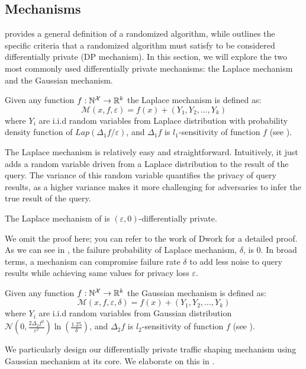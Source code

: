 \subsection{Mechanisms}\label{subsec:background-dp-mechanism}
 provides a general definition of a randomized algorithm, while  outlines the specific criteria that a randomized algorithm must satisfy to be considered differentially private (\ie DP mechanism).
In this section, we will explore the two most commonly used differentially private mechanisms: the Laplace mechanism and the Gaussian mechanism\cite{dwork2014algorithmic}.
\begin{definition}\label{def:laplace-mechanism}
  Given any function $f: \mathbb{N}^\mathcal{X} \rightarrow \mathbb{R}^k$ the Laplace mechanism is defined as:
  \begin{equation*}
    \mathcal{M}(x, f, \varepsilon) = f(x) + (Y_1, Y_2, \dots, Y_k)
  \end{equation*}
  where $Y_i$ are i.i.d random variables from Laplace distribution with probability density function of $Lap(\Delta_1 f/\varepsilon)$, and $\Delta_1 f$ is $l_1$-sensitivity of function $f$ (see ).
\end{definition}
The Laplace mechanism is relatively easy and straightforward. 
Intuitively, it just adds a random variable driven from a Laplace distribution to the result of the query.
The variance of this random variable quantifies the privacy of query results, as a higher variance makes it more challenging for adversaries to infer the true result of the query.
\begin{proposition}
  The Laplace mechanism of  is $(\varepsilon, 0)$-differentially private. 
\end{proposition}
\noindent
We omit the proof here; you can refer to the work of Dwork for a detailed proof. 
As we can see in , the failure probability of Laplace mechanism, $\delta$, is 0.
In broad terms, a mechanism can compromise failure rate $\delta$ to add less noise to query results while achieving same values for privacy loss $\varepsilon$.
\begin{definition}\label{def:gaussian-mechanism}
  Given any function $f: \mathbb{N}^\mathcal{X} \rightarrow \mathbb{R}^k$ the Gaussian mechanism is defined as:
  \begin{equation*}
    \mathcal{M}(x, f, \varepsilon, \delta) = f(x) + (Y_1, Y_2, \dots, Y_k)
  \end{equation*}
  where $Y_i$ are i.i.d random variables from Gaussian distribution $\mathcal{N}(0, \frac{2\Delta_2 f^2}{\varepsilon^2})\ln(\frac{1.25}{\delta})$, and $\Delta_2 f$ is $l_2$-sensitivity of function $f$ (see ).
\end{definition}
We particularly design our differentially private traffic shaping mechanism using Gaussian mechanism at its core. 
We elaborate on this in .


